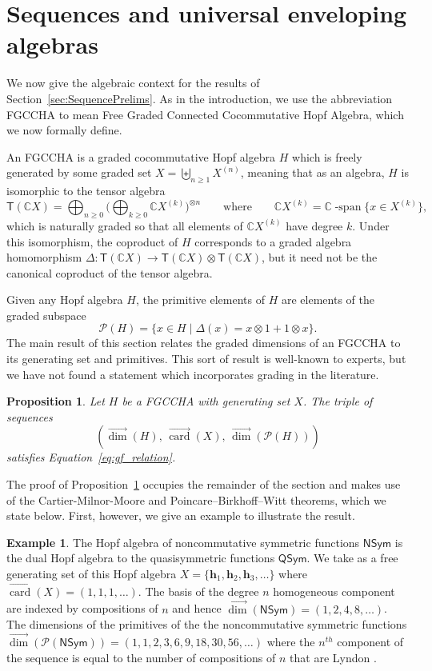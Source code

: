 \documentclass[11pt]{amsart}
\newtheorem{proposition}[theorem]{Proposition}
\theoremstyle{definition}
\newtheorem{example}[theorem]{Example}
\numberwithin{equation}{section}
\def\CC{{\mathbb C}}
\newcommand{\FGCCHA}{\textsf{FGCCHA}\xspace}
\newcommand{\vecdim}{\overrightarrow{\dim}}
\newcommand{\veccard}{\overrightarrow{\operatorname{card}}}
\begin{document}
\section{Sequences and universal enveloping algebras}

We now give the algebraic context for the results of Section~\ref{sec:SequencePrelims}.  
As in the introduction, we use the abbreviation \FGCCHA to mean \textsf{F}ree \textsf{G}raded \textsf{C}onnected \textsf{C}ocommutative \textsf{H}opf \textsf{A}lgebra, which we now formally define.

An \FGCCHA is a graded cocommutative Hopf algebra $H$ which is freely generated by some graded set $X = \biguplus_{n \ge 1} X^{(n)}$, meaning that as an algebra, $H$ is isomorphic to the tensor algebra
\[
\mathsf{T}(\CC X) = \bigoplus_{n \ge 0} \Big( \bigoplus_{k \ge 0} \CC X^{(k)}\Big)^{\otimes n}
\qquad\text{where}\qquad
\CC X^{(k)} = \CC\operatorname{-span}\{x \in X^{(k)}\},
\]
which is naturally graded so that all elements of $\CC X^{(k)}$ have degree $k$.  
Under this isomorphism, the coproduct of $H$ corresponds to a graded algebra homomorphism $\Delta: \mathsf{T}(\CC X) \to \mathsf{T}(\CC X) \otimes \mathsf{T}(\CC X)$, but it need not be the canonical coproduct of the tensor algebra.

Given any Hopf algebra $H$, the primitive elements of $H$ are elements of the graded subspace
\[
\mathcal{P}(H) = \{x \in H \;|\; \Delta(x) = x \otimes 1 + 1 \otimes x\}.
\]
The main result of this section relates the graded dimensions of an \FGCCHA to its generating set and primitives.  
This sort of result is well-known to experts, but we have not found a statement which incorporates grading in the literature.  

\begin{proposition}
\label{prop:SequencesAsHopfStructures}
Let $H$ be a \FGCCHA with generating set $X$.  The triple of sequences
\[
\left(\vecdim(H), \,
\veccard(X),\,
\vecdim\left(\mathcal{P}(H)\right) \right)
\]
satisfies Equation~\eqref{eq:gf_relation}.
\end{proposition}

The proof of Proposition~\ref{prop:SequencesAsHopfStructures} occupies the remainder of the section and makes use of the Cartier-Milnor-Moore and Poincare--Birkhoff--Witt theorems, which we state below.  First, however,  we give an example to illustrate the result.  

\begin{example}
The Hopf algebra of noncommutative symmetric functions $\mathsf{NSym}$ \cite{GKLLRT}
is the dual Hopf algebra to the quasisymmetric functions $\mathsf{QSym}$.
We take as a free generating set of this Hopf algebra
$X = \{ \mathbf{h}_1, \mathbf{h}_2, \mathbf{h}_3, \ldots \}$
where $\veccard(X) = (1,1,1,\ldots)$.
The basis of the degree $n$ homogeneous component are indexed by compositions
of $n$ and hence $\vecdim(\mathsf{NSym}) = (1,2,4,8,\ldots)$.
The dimensions of the primitives
of the the noncommutative symmetric functions
$\vecdim(\mathcal{P}(\mathsf{NSym})) = (1, 1, 2, 3, 6, 9, 18, 30, 56, \ldots)$
where the $n^{th}$ component of the sequence is equal to the number
of compositions of $n$ that are Lyndon \cite[Section 4]{H05}.
\end{example}
\end{document}
